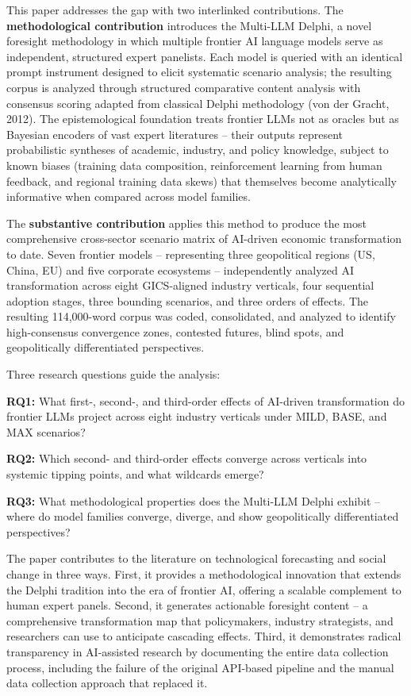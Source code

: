 \documentclass{article}
\begin{document}
This paper addresses the gap with two interlinked contributions. The \textbf{methodological contribution} introduces the Multi-LLM Delphi, a novel foresight methodology in which multiple frontier AI language models serve as independent, structured expert panelists. Each model is queried with an identical prompt instrument designed to elicit systematic scenario analysis; the resulting corpus is analyzed through structured comparative content analysis with consensus scoring adapted from classical Delphi methodology (von der Gracht, 2012). The epistemological foundation treats frontier LLMs not as oracles but as Bayesian encoders of vast expert literatures -- their outputs represent probabilistic syntheses of academic, industry, and policy knowledge, subject to known biases (training data composition, reinforcement learning from human feedback, and regional training data skews) that themselves become analytically informative when compared across model families.

The \textbf{substantive contribution} applies this method to produce the most comprehensive cross-sector scenario matrix of AI-driven economic transformation to date. Seven frontier models -- representing three geopolitical regions (US, China, EU) and five corporate ecosystems -- independently analyzed AI transformation across eight GICS-aligned industry verticals, four sequential adoption stages, three bounding scenarios, and three orders of effects. The resulting 114,000-word corpus was coded, consolidated, and analyzed to identify high-consensus convergence zones, contested futures, blind spots, and geopolitically differentiated perspectives.

Three research questions guide the analysis:

\textbf{RQ1:} What first-, second-, and third-order effects of AI-driven transformation do frontier LLMs project across eight industry verticals under MILD, BASE, and MAX scenarios?

\textbf{RQ2:} Which second- and third-order effects converge across verticals into systemic tipping points, and what wildcards emerge?

\textbf{RQ3:} What methodological properties does the Multi-LLM Delphi exhibit -- where do model families converge, diverge, and show geopolitically differentiated perspectives?

The paper contributes to the literature on technological forecasting and social change in three ways. First, it provides a methodological innovation that extends the Delphi tradition into the era of frontier AI, offering a scalable complement to human expert panels. Second, it generates actionable foresight content -- a comprehensive transformation map that policymakers, industry strategists, and researchers can use to anticipate cascading effects. Third, it demonstrates radical transparency in AI-assisted research by documenting the entire data collection process, including the failure of the original API-based pipeline and the manual data collection approach that replaced it.
\end{document}
